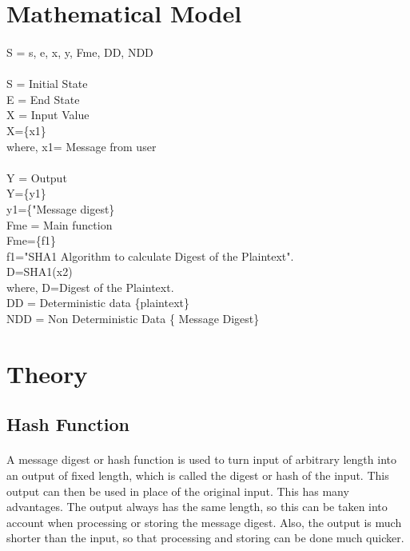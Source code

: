\documentclass[a4paper,12pt]{article}
\begin{document}
\section{Mathematical Model}
\paragraph{} 
S 	= {s, e, x, y, Fme, DD, NDD}  											\\\\
S   =   Initial State  														\\
E 	=   End State  															\\
X	= Input Value															\\
X=\{x1\} 																\\
where,  x1= Message from user
\\																\\
Y	= Output																\\
Y=\{y1\}																	\\
y1=\{"Message digest\}									\\
Fme 	= 	Main function 													\\
Fme=\{f1\}\\f1="SHA1 Algorithm to calculate Digest of the Plaintext".		\\
D=SHA1(x2)																	\\
where, D=Digest of the Plaintext.											\\
DD 	= 	Deterministic data \{plaintext\}					\\
NDD	= 	Non Deterministic Data \{ Message Digest\}							\\

	
\section{Theory}
	\subsection{Hash Function}
		\paragraph{} A message digest or hash function is used to turn input of arbitrary length into an output of fixed length, which is called the digest or hash of the input. This output can then be used in place of the original input. This has many advantages. The output always has the same length, so this can be taken into account when processing or storing the message digest. Also, the output is much shorter than the input, so that processing and storing can be done much quicker.		
\end{document}
